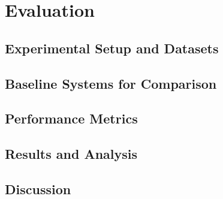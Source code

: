 \chapter{Evaluation}
\section{Experimental Setup and Datasets}
\section{Baseline Systems for Comparison}
\section{Performance Metrics}
\section{Results and Analysis}
\section{Discussion}